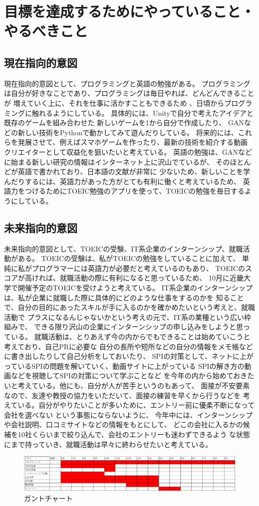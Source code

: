 \documentclass{jsarticle}
\begin{document}
\section{目標を達成するためにやっていること・やるべきこと}
\subsection{現在指向的意図}
現在指向的意図として、プログラミングと英語の勉強がある。
プログラミングは自分が好きなことであり、プログラミングは毎日やれば、どんどんできることが
増えていく上に、それを仕事に活かすこともできるため
、日頃からプログラミングに触れるようにしている。
具体的には、Unityで自分で考えたアイデアと既存のゲームを組み合わせた
新しいゲームを1から自分で作成したり、
GANなどの新しい技術をPythonで動かしてみて遊んだりしている。
将来的には、これらを発展させて、例えばスマホゲームを作ったり、最新の技術を紹介する動画
クリエイターとして収益化を狙いたいと考えている。
英語の勉強は、GANなどに始まる新しい研究の情報はインターネット上に沢山でているが、
そのほとんどが英語で書かれており、日本語の文献が非常に
少ないため、新しいことを学んだりするには、英語力があった方がとても有利に働くと考えているため、
英語力をつけるためにTOEIC勉強のアプリを使って、TOEICの勉強を毎日するようにしている。
\subsection{未来指向的意図}
未来指向的意図として、TOEICの受験、IT系企業のインターンシップ、就職活動がある。
TOEICの受験は、私がTOEICの勉強をしていることに加えて、
単純に私がプログラマーには英語力が必要だと考えているのもあり、
TOEICのスコアが高ければ、就職活動の際に有利になると思っているため、
10月に近畿大学で開催予定のTOEICを受けようと考えている。
IT系企業のインターンシップは、私が企業に就職した際に具体的にどのような仕事をするのかを
知ることで、自分の目的にあったスキルが手に入るのかを確かめたいという考えと、就職活動で
プラスになるんじゃないかという考えの元で、IT系の業種という広い枠組みで、
できる限り沢山の企業にインターンシップの申し込みをしようと思っている。
就職活動は、とりあえず今の内からでもできることは始めていこうと考えており、自己PRに必要な
自分の長所や短所などの自分の情報をメモ帳などに書き出したりして自己分析をしておいたり、
SPIの対策として、ネットに上がっているSPIの問題を解いていく、動画サイトに上がっている
SPIの解き方の動画などを視聴してSPIの対策について学ぶことなど
を今年の内から始めておきたいと考えている。他にも、自分が人が苦手というのもあって、
面接が不安要素なので、友達や教授の協力をいただいて、面接の練習を早くから行うなどを
考えている。自分がやりたいことが多いために、エントリー前に優柔不断になって会社を選べない
という事態にならないように、
今年中には、インターンシップや会社説明、口コミサイトなどの情報をもとにして、
どこの会社に入るかの候補を10社くらいまで絞り込んで、会社のエントリーも迷わずできるよう
な状態にまで持っていき、就職活動は早々に終わらせたいと考えている。


\begin{figure}[b]
  \begin{center}
  \includegraphics[scale=0.5]{1.eps}
  \caption{ガントチャート
  }
  \label{fig:1}
  \end{center}
\end{figure}
\end{document}
